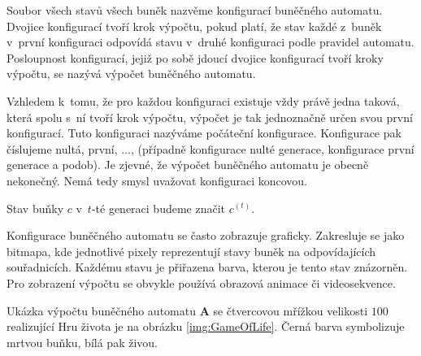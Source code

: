 Soubor všech stavů všech buněk nazvěme konfigurací buněčného automatu. Dvojice konfigurací tvoří krok výpočtu, pokud platí, že stav každé z~buněk v~první konfiguraci odpovídá stavu v~druhé konfiguraci podle pravidel automatu. Posloupnost konfigurací, jejiž po sobě jdoucí dvojice konfigurací tvoří kroky výpočtu, se nazývá výpočet buněčného automatu.

Vzhledem k~tomu, že pro každou konfiguraci existuje vždy právě jedna taková, která spolu s~ní tvoří krok výpočtu, výpočet je tak jednoznačně určen svou první konfigurací. Tuto konfiguraci nazýváme počáteční konfigurace. Konfigurace pak číslujeme nultá, první, $\dots$, (případně konfigurace nulté generace, konfigurace první generace a podob). Je zjevné, že výpočet buněčného automatu je obecně nekonečný. Nemá tedy smysl uvažovat konfiguraci koncovou.

\begin{notation}
	Stav buňky $c$ v~$t$-té generaci budeme značit $c^{(t)}$.
\end{notation}


Konfigurace buněčného automatu se často zobrazuje graficky. Zakresluje se jako bitmapa, kde jednotlivé pixely reprezentují stavy buněk na odpovídajících souřadnicích. Každému stavu je přiřazena barva, kterou je tento stav znázorněn. Pro zobrazení výpočtu se obvykle používá obrazová animace či videosekvence.

\begin{example}
  Ukázka výpočtu buněčného automatu $\mathbf{A}$ se čtvercovou mřížkou velikosti $100$ realizující Hru života je na obrázku \ref{img:GameOfLife}. Černá barva symbolizuje mrtvou buňku, bílá pak živou. 
\end{example}


